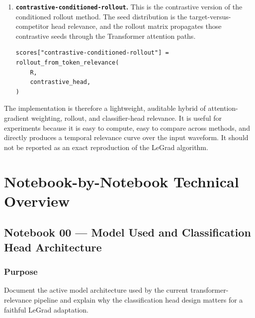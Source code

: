 \documentclass[11pt]{article}
\begin{document}
\begin{enumerate}
\begin{verbatim}
def rollout_from_token_relevance(R, token_relevance):
    seeds = clamp_min(token_relevance, 0)
    seeds = normalize_or_uniform(seeds)

    conditioned = batch_matmul(seeds[:, None, :], R)
    conditioned = squeeze(conditioned, axis=1)
    conditioned = clamp_min(conditioned, 0)

    return conditioned / sum(conditioned)

scores["head-conditioned-rollout"] = rollout_from_token_relevance(
    R,
    head_relevance,
)
\end{verbatim}

  \item \textbf{\texttt{contrastive-conditioned-rollout}.} This is the
  contrastive version of the conditioned rollout method. The seed distribution
  is the target-versus-competitor head relevance, and the rollout matrix
  propagates those contrastive seeds through the Transformer attention paths.

\begin{verbatim}
scores["contrastive-conditioned-rollout"] = rollout_from_token_relevance(
    R,
    contrastive_head,
)
\end{verbatim}
\end{enumerate}

The implementation is therefore a lightweight, auditable hybrid of
attention-gradient weighting, rollout, and classifier-head relevance. It is
useful for experiments because it is easy to compute, easy to compare across
methods, and directly produces a temporal relevance curve over the input
waveform. It should not be reported as an exact reproduction of the LeGrad
algorithm.

\section{Notebook-by-Notebook Technical Overview}

\subsection{Notebook 00 --- Model Used and Classification Head Architecture}

\subsubsection*{Purpose}
Document the active model architecture used by the current transformer-relevance
pipeline and explain why the classification head design matters for a faithful
LeGrad adaptation.
\end{document}
